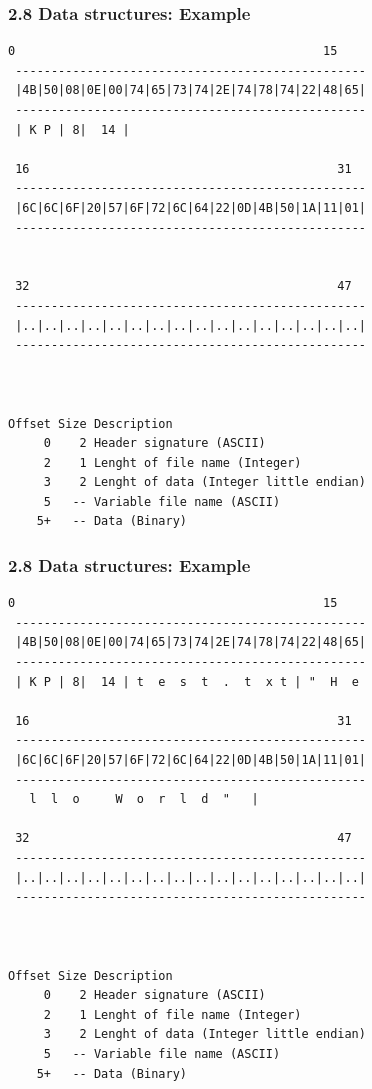 \begin{frame}[fragile]
  \frametitle{2.8 Data structures: Example}
\begin{lstlisting}[basicstyle=\tiny]
  0                                           15
 -------------------------------------------------
 |4B|50|08|0E|00|74|65|73|74|2E|74|78|74|22|48|65|
 -------------------------------------------------
 | K P | 8|  14 | 

 16                                           31
 -------------------------------------------------
 |6C|6C|6F|20|57|6F|72|6C|64|22|0D|4B|50|1A|11|01|
 -------------------------------------------------
  

 32                                           47
 -------------------------------------------------
 |..|..|..|..|..|..|..|..|..|..|..|..|..|..|..|..|
 -------------------------------------------------
 
 
 
Offset Size Description
     0    2 Header signature (ASCII)
     2    1 Lenght of file name (Integer)
     3    2 Lenght of data (Integer little endian)
     5   -- Variable file name (ASCII)
    5+   -- Data (Binary)
\end{lstlisting}
\end{frame}


\begin{frame}[fragile]
  \frametitle{2.8 Data structures: Example}
\begin{lstlisting}[basicstyle=\tiny]
  0                                           15
 -------------------------------------------------
 |4B|50|08|0E|00|74|65|73|74|2E|74|78|74|22|48|65|
 -------------------------------------------------
 | K P | 8|  14 | t  e  s  t  .  t  x t | "  H  e

 16                                           31
 -------------------------------------------------
 |6C|6C|6F|20|57|6F|72|6C|64|22|0D|4B|50|1A|11|01|
 -------------------------------------------------
   l  l  o     W  o  r  l  d  "   | 

 32                                           47
 -------------------------------------------------
 |..|..|..|..|..|..|..|..|..|..|..|..|..|..|..|..|
 -------------------------------------------------
 
 
 
Offset Size Description
     0    2 Header signature (ASCII)
     2    1 Lenght of file name (Integer)
     3    2 Lenght of data (Integer little endian)
     5   -- Variable file name (ASCII)
    5+   -- Data (Binary)
\end{lstlisting}
\end{frame}


